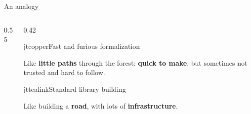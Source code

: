 \documentclass[aspectratio=169,10pt]{beamer}
\begin{document}
\begin{frame}{An analogy}
  \vfill
  \begin{columns}[c,onlytextwidth]
    \begin{column}{0.55\textwidth}
      \centering
      \resizebox{\linewidth}{!}{}
    \end{column}
    \begin{column}{0.42\textwidth}
      \begin{jtblockcap}[top=5pt,bottom=5pt]{jtcopper}{Fast and furious formalization}
        {\fontsize{10.5}{13.6}\selectfont\color{jtslate}%
          Like {\bfseries little paths} through the forest:
          {\bfseries quick to make}, but sometimes not trusted and hard
          to follow.\par}
      \end{jtblockcap}
      \vspace{2pt}
      \begin{jtblockcap}[top=5pt,bottom=5pt]{jttealink}{Standard library building}
        {\fontsize{10.5}{13.6}\selectfont\color{jtslate}%
          Like building a {\bfseries road}, with lots of
          {\bfseries infrastructure}.\par}
      \end{jtblockcap}
    \end{column}
  \end{columns}
  \vfill
\end{frame}
\end{document}
